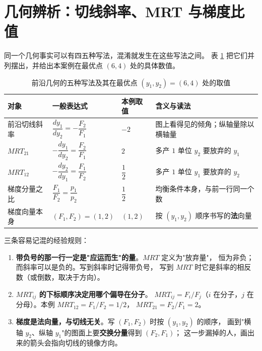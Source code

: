 \section{几何辨析：切线斜率、MRT 与梯度比值}
\label{sec:geometry-check}

同一个几何事实可以有四五种写法，混淆就发生在这些写法之间。
表 \ref{tab:geometry} 把它们并列摆出，并给出本案例在最优点 $(6,4)$ 处的具体数值。

\begin{table}[H]
\centering
\caption{前沿几何的五种写法及其在最优点 $(y_1,y_2)=(6,4)$ 处的取值}
\label{tab:geometry}
\begin{tabular}{p{4.0cm}p{3.3cm}p{2.2cm}p{3.8cm}}
\toprule
对象 & 一般表达式 & 本例取值 & 含义与读法 \\
\midrule
前沿切线斜率 & $\dfrac{dy_1}{dy_2}=-\dfrac{F_2}{F_1}$ & $-2$ & 图上看得见的倾角；纵轴量除以横轴量 \\[4pt]
$MRT_{21}$ & $-\dfrac{dy_1}{dy_2}=\dfrac{F_2}{F_1}$ & $2$ & 多产 $1$ 单位 $y_2$ 要放弃的 $y_1$ \\[4pt]
$MRT_{12}$ & $-\dfrac{dy_2}{dy_1}=\dfrac{F_1}{F_2}$ & $\dfrac12$ & 多产 $1$ 单位 $y_1$ 要放弃的 $y_2$ \\[4pt]
梯度分量之比 & $\dfrac{F_1}{F_2}=\dfrac{p_1}{p_2}$ & $\dfrac12$ & 均衡条件本身，与前一行同一个数 \\[4pt]
梯度向量本身 & $(F_1,F_2)=(1,2)$ & $(1,2)$ & 按 $(y_1,y_2)$ 顺序书写的\textbf{法}向量 \\
\bottomrule
\end{tabular}
\end{table}

三条容易记混的经验规则：

\begin{enumerate}
  \item \textbf{带负号的那一行一定是"应运而生"的量}。$MRT$ 定义为"放弃量"，
        恒为非负；而斜率可以是负的。写到斜率时记得带负号，
        写到 $MRT$ 时它是斜率的相反数（或倒数，取决于方向）。
  \item \textbf{$MRT_{ij}$ 的下标顺序决定用哪个偏导在分子}。
        $MRT_{ij}=F_i/F_j$（$i$ 在分子，$j$ 在分母）。本例 $MRT_{12}=F_1/F_2=1/2$，
        $MRT_{21}=F_2/F_1=2$。
  \item \textbf{梯度是法向量，与切线无关}。写 $(F_1,F_2)$ 时按 $(y_1,y_2)$ 的顺序，
        画到"横轴 $y_2$、纵轴 $y_1$"的图面上要\textbf{交换分量}得到 $(F_2,F_1)$；
        这一步漏掉的人，画出来的箭头会指向切线的镜像方向。
\end{enumerate}
